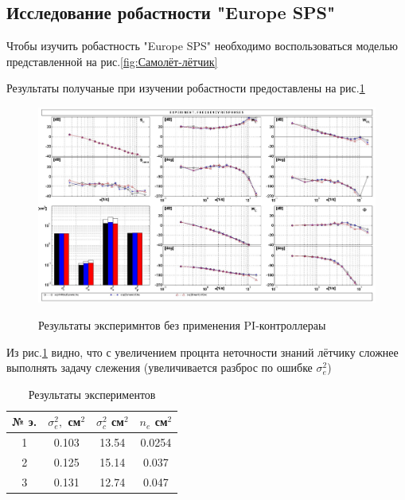 \subsection{Исследование робастности "Europe SPS"} 
\label{sec:Исследование робастности}

Чтобы изучить робастность "Europe SPS" необходимо воспользоваться моделью представленной на рис.{\ref{fig:Самолёт-лётчик}}

Результаты получаные при изучении робастности предоставлены на рис.\ref{fig:Модель без PI}

\begin{figure}[H]
    \centering \includegraphics[width=\linewidth]{Оглавление/Part3/figures/Модель без PI.jpg}
    \caption{Результаты эксперимнтов без применения PI-контроллераы}
    {\label{fig:Модель без PI}}
\end{figure}
Из рис.{\ref{fig:Модель без PI}} видно, что с увеличением процнта неточности знаний лётчику сложнее выполнять задачу слежения 
(увеличивается разброс по ошибке $\sigma_e^2$)

\begin{table}[H]
    \caption{Результаты экспериментов}
    \centering
    \label{tab:Результаты экспериментов без PI}
    \begin{tabular}{|c|c|c|c|}
        \hline 
        № э.& $\sigma^2_e,$ см$^2$ & $\sigma^2_c$ см$^2$ & $n_e$ см$^2$ \\ \hline 
        1& 0.103 & 13.54 & 0.0254\\ \hline
        2& 0.125 & 15.14  & 0.037 \\ \hline
        3& 0.131 & 12.74 & 0.047\\ \hline

    \end{tabular}
\end{table}

